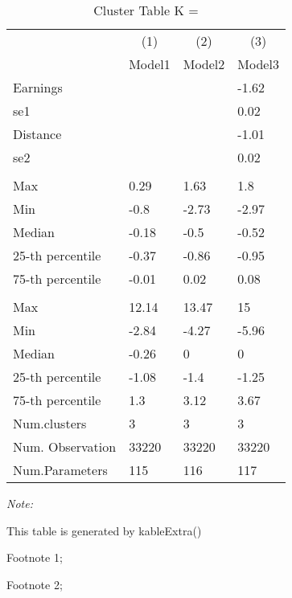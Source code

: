 \begin{table}
\centering
\caption{Cluster Table K = }
\centering
\begin{threeparttable}
\begin{tabular}[t]{llll}
\toprule
\multicolumn{1}{c}{ } & \multicolumn{1}{c}{(1)} & \multicolumn{1}{c}{(2)} & \multicolumn{1}{c}{(3)} \\
\cmidrule(l{3pt}r{3pt}){2-2} \cmidrule(l{3pt}r{3pt}){3-3} \cmidrule(l{3pt}r{3pt}){4-4}
 & Model1 & Model2 & Model3\\
\midrule
Earnings &  &  & -1.62\\
se1 &  &  & 0.02\\
Distance &  &  & -1.01\\
se2 &  &  & 0.02\\
\addlinespace[0.3em]
\multicolumn{4}{l}{\textit{\textbf{Panel A: }}}\\
\hspace{1em}Max & 0.29 & 1.63 & 1.8\\
\hspace{1em}Min & -0.8 & -2.73 & -2.97\\
\hspace{1em}Median & -0.18 & -0.5 & -0.52\\
\hspace{1em}25-th percentile & -0.37 & -0.86 & -0.95\\
\hspace{1em}75-th percentile & -0.01 & 0.02 & 0.08\\
\addlinespace[0.3em]
\multicolumn{4}{l}{\textit{\textbf{Panel B: }}}\\
\hspace{1em}Max & 12.14 & 13.47 & 15\\
\hspace{1em}Min & -2.84 & -4.27 & -5.96\\
\hspace{1em}Median & -0.26 & 0 & 0\\
\hspace{1em}25-th percentile & -1.08 & -1.4 & -1.25\\
\hspace{1em}75-th percentile & 1.3 & 3.12 & 3.67\\
Num.clusters & 3 & 3 & 3\\
Num. Observation & 33220 & 33220 & 33220\\
Num.Parameters & 115 & 116 & 117\\
\bottomrule
\end{tabular}
\begin{tablenotes}
\item \textit{Note: } 
\item This table is generated by kableExtra()
\item[1] Footnote 1; 
\item[2] Footnote 2; 
\end{tablenotes}
\end{threeparttable}
\end{table}
